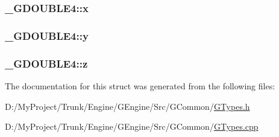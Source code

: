 \subsubsection[{x}]{ \+\_\+\+G\+D\+O\+U\+B\+L\+E4\+::x}\label{struct___g_d_o_u_b_l_e4_a9497562bf12fc4ee54fe01447006e0b9}
\hypertarget{struct___g_d_o_u_b_l_e4_a58d464e8d8f28c6cbb76fcb948bd15cb}{}
\subsubsection[{y}]{ \+\_\+\+G\+D\+O\+U\+B\+L\+E4\+::y}\label{struct___g_d_o_u_b_l_e4_a58d464e8d8f28c6cbb76fcb948bd15cb}
\hypertarget{struct___g_d_o_u_b_l_e4_a31b0f16ba56fa8ca0a97727d88d8cf61}{}
\subsubsection[{z}]{ \+\_\+\+G\+D\+O\+U\+B\+L\+E4\+::z}\label{struct___g_d_o_u_b_l_e4_a31b0f16ba56fa8ca0a97727d88d8cf61}


The documentation for this struct was generated from the following files\+:\begin{DoxyCompactItemize}
\item 
D\+:/\+My\+Project/\+Trunk/\+Engine/\+G\+Engine/\+Src/\+G\+Common/\hyperlink{_g_types_8h}{G\+Types.\+h}\item 
D\+:/\+My\+Project/\+Trunk/\+Engine/\+G\+Engine/\+Src/\+G\+Common/\hyperlink{_g_types_8cpp}{G\+Types.\+cpp}\end{DoxyCompactItemize}

